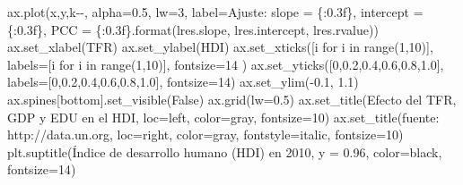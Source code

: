 \documentclass[
  letterpaper,
  DIV=11,
  numbers=noendperiod]{scrreprt}
\newenvironment{Shaded}{\begin{snugshade}}{\end{snugshade}}
\newcommand{\BuiltInTok}[1]{\textcolor[rgb]{0.00,0.23,0.31}{#1}}
\newcommand{\ControlFlowTok}[1]{\textcolor[rgb]{0.00,0.23,0.31}{#1}}
\newcommand{\DecValTok}[1]{\textcolor[rgb]{0.68,0.00,0.00}{#1}}
\newcommand{\FloatTok}[1]{\textcolor[rgb]{0.68,0.00,0.00}{#1}}
\newcommand{\KeywordTok}[1]{\textcolor[rgb]{0.00,0.23,0.31}{#1}}
\newcommand{\NormalTok}[1]{\textcolor[rgb]{0.00,0.23,0.31}{#1}}
\newcommand{\OperatorTok}[1]{\textcolor[rgb]{0.37,0.37,0.37}{#1}}
\newcommand{\SpecialCharTok}[1]{\textcolor[rgb]{0.37,0.37,0.37}{#1}}
\newcommand{\StringTok}[1]{\textcolor[rgb]{0.13,0.47,0.30}{#1}}
\newcommand{\VariableTok}[1]{\textcolor[rgb]{0.07,0.07,0.07}{#1}}
\begin{document}
\begin{Shaded}
\begin{Highlighting}[]
\NormalTok{ax.plot(x,y,}\StringTok{\textquotesingle{}k{-}{-}\textquotesingle{}}\NormalTok{, alpha}\OperatorTok{=}\FloatTok{0.5}\NormalTok{, lw}\OperatorTok{=}\DecValTok{3}\NormalTok{, label}\OperatorTok{=}\StringTok{\textquotesingle{}Ajuste: slope = }\SpecialCharTok{\{:0.3f\}}\StringTok{, intercept = }\SpecialCharTok{\{:0.3f\}}\StringTok{, PCC = }\SpecialCharTok{\{:0.3f\}}\StringTok{\textquotesingle{}}\NormalTok{.}\BuiltInTok{format}\NormalTok{(lres.slope, lres.intercept, lres.rvalue))}
\NormalTok{ax.set\_xlabel(}\StringTok{\textquotesingle{}TFR\textquotesingle{}}\NormalTok{)}
\NormalTok{ax.set\_ylabel(}\StringTok{\textquotesingle{}HDI\textquotesingle{}}\NormalTok{)}
\NormalTok{ax.set\_xticks([i }\ControlFlowTok{for}\NormalTok{ i }\KeywordTok{in} \BuiltInTok{range}\NormalTok{(}\DecValTok{1}\NormalTok{,}\DecValTok{10}\NormalTok{)], labels}\OperatorTok{=}\NormalTok{[i }\ControlFlowTok{for}\NormalTok{ i }\KeywordTok{in} \BuiltInTok{range}\NormalTok{(}\DecValTok{1}\NormalTok{,}\DecValTok{10}\NormalTok{)], fontsize}\OperatorTok{=}\DecValTok{14}\NormalTok{ )}
\NormalTok{ax.set\_yticks([}\DecValTok{0}\NormalTok{,}\FloatTok{0.2}\NormalTok{,}\FloatTok{0.4}\NormalTok{,}\FloatTok{0.6}\NormalTok{,}\FloatTok{0.8}\NormalTok{,}\FloatTok{1.0}\NormalTok{], labels}\OperatorTok{=}\NormalTok{[}\DecValTok{0}\NormalTok{,}\FloatTok{0.2}\NormalTok{,}\FloatTok{0.4}\NormalTok{,}\FloatTok{0.6}\NormalTok{,}\FloatTok{0.8}\NormalTok{,}\FloatTok{1.0}\NormalTok{], fontsize}\OperatorTok{=}\DecValTok{14}\NormalTok{)}
\NormalTok{ax.set\_ylim(}\OperatorTok{{-}}\FloatTok{0.1}\NormalTok{, }\FloatTok{1.1}\NormalTok{)}
\NormalTok{ax.spines[}\StringTok{\textquotesingle{}bottom\textquotesingle{}}\NormalTok{].set\_visible(}\VariableTok{False}\NormalTok{)}
\NormalTok{ax.grid(lw}\OperatorTok{=}\FloatTok{0.5}\NormalTok{)}
\NormalTok{ax.set\_title(}\StringTok{\textquotesingle{}Efecto del TFR, GDP y EDU en el HDI\textquotesingle{}}\NormalTok{, loc}\OperatorTok{=}\StringTok{\textquotesingle{}left\textquotesingle{}}\NormalTok{, color}\OperatorTok{=}\StringTok{\textquotesingle{}gray\textquotesingle{}}\NormalTok{, fontsize}\OperatorTok{=}\DecValTok{10}\NormalTok{)}
\NormalTok{ax.set\_title(}\StringTok{\textquotesingle{}fuente: http://data.un.org\textquotesingle{}}\NormalTok{, loc}\OperatorTok{=}\StringTok{\textquotesingle{}right\textquotesingle{}}\NormalTok{, color}\OperatorTok{=}\StringTok{\textquotesingle{}gray\textquotesingle{}}\NormalTok{, fontstyle}\OperatorTok{=}\StringTok{\textquotesingle{}italic\textquotesingle{}}\NormalTok{, fontsize}\OperatorTok{=}\DecValTok{10}\NormalTok{)}
\NormalTok{plt.suptitle(}\StringTok{\textquotesingle{}Índice de desarrollo humano (HDI) en 2010\textquotesingle{}}\NormalTok{, y }\OperatorTok{=} \FloatTok{0.96}\NormalTok{, color}\OperatorTok{=}\StringTok{\textquotesingle{}black\textquotesingle{}}\NormalTok{, fontsize}\OperatorTok{=}\DecValTok{14}\NormalTok{)}

\end{Highlighting}
\end{Shaded}
\end{document}
